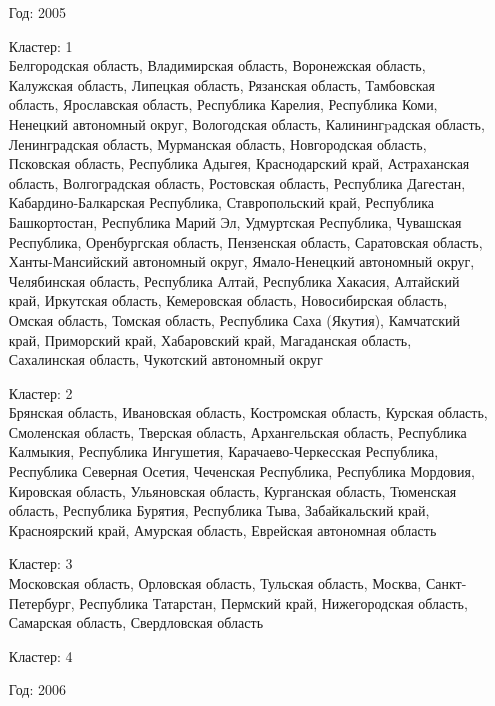 \documentclass[11pt]{article}
\begin{document}
\begin{itemize}
    \item[Год:  2005]

Кластер:  1 \\
Белгородская область, Владимирская область, Воронежская область, Калужская область, Липецкая область, Рязанская область, Тамбовская область, Ярославская область, Республика Карелия, Республика Коми, Ненецкий автономный округ, Вологодская область, Калинингpадская область, Ленинградская область, Мурманская область, Новгородская область, Псковская область, Республика Адыгея, Краснодарский край, Астраханская область, Волгоградская область, Ростовская область, Республика Дагестан, Кабардино-Балкарская Республика, Ставропольский край, Республика Башкортостан, Республика Марий Эл, Удмуртская Республика, Чувашская Республика, Оренбургская область, Пензенская область, Саратовская область, Ханты-Мансийский автономный округ, Ямало-Ненецкий автономный округ, Челябинская область, Республика Алтай, Республика Хакасия, Алтайский край, Иркутская область, Кемеровская область, Новосибирская область, Омская область, Томская область, Республика Саха (Якутия), Камчатский край, Приморский край, Хабаровский край, Магаданская область, Сахалинская область, Чукотский автономный округ

Кластер:  2 \\
Брянская область, Ивановская область, Костромская область, Курская область, Смоленская область, Тверская область, Архангельская область, Республика Калмыкия, Республика Ингушетия, Карачаево-Черкесская Республика, Республика Северная Осетия, Чеченская Республика, Республика Мордовия, Кировская область, Ульяновская область, Курганская область, Тюменская область, Республика Бурятия, Республика Тыва, Забайкальский край, Красноярский край, Амурская область, Еврейская автономная область

Кластер:  3 \\
Московская область, Орловская область, Тульская область, Москва, Санкт-Петербург, Республика Татарстан, Пермский край, Нижегородская область, Самарская область, Свердловская область

Кластер:  4 \\



    \item[Год:  2006]


\end{itemize}
\end{document}
